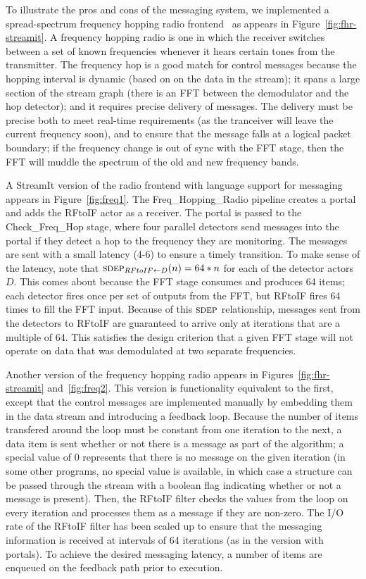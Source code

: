 To illustrate the pros and cons of the messaging system, we
implemented a spread-spectrum frequency hopping radio
frontend~\cite{harada02} as appears in Figure~\ref{fig:fhr-streamit}.
A frequency hopping radio is one in which the receiver switches
between a set of known frequencies whenever it hears certain tones
from the transmitter.  The frequency hop is a good match for control
messages because the hopping interval is dynamic (based on on the data
in the stream); it spans a large section of the stream graph (there is
an FFT between the demodulator and the hop detector); and it requires
precise delivery of messages.  The delivery must be precise both to
meet real-time requirements (as the tranceiver will leave the current
frequency soon), and to ensure that the message falls at a logical
packet boundary; if the frequency change is out of sync with the FFT
stage, then the FFT will muddle the spectrum of the old and new
frequency bands.

A StreamIt version of the radio frontend with language support for
messaging appears in Figure~\ref{fig:freq1}.  The Freq\_Hopping\_Radio
pipeline creates a portal and adds the RFtoIF actor as a receiver.
The portal is passed to the Check\_Freq\_Hop stage, where four
parallel detectors send messages into the portal if they detect a hop
to the frequency they are monitoring.  The messages are sent with a
small latency (4-6) to ensure a timely transition.  To make sense of
the latency, note that $\sdepf{RFtoIF}{D}(n) = 64*n$ for each of the
detector actors $D$.  This comes about because the FFT stage consumes
and produces 64 items; each detector fires once per set of outputs
from the FFT, but RFtoIF fires 64 times to fill the FFT input.
Because of this $\textsc{sdep}$ relationship, messages sent from the detectors
to RFtoIF are guaranteed to arrive only at iterations that are a
multiple of 64.  This satisfies the design criterion that a given FFT
stage will not operate on data that was demodulated at two separate
frequencies.

Another version of the frequency hopping radio appears in
Figures~\ref{fig:fhr-streamit} and~\ref{fig:freq2}.  This version is
functionality equivalent to the first, except that the control
messages are implemented manually by embedding them in the data stream
and introducing a feedback loop.  Because the number of items
transfered around the loop must be constant from one iteration to the
next, a data item is sent whether or not there is a message as part of
the algorithm; a special value of 0 represents that there is no
message on the given iteration (in some other programs, no special
value is available, in which case a structure can be passed through
the stream with a boolean flag indicating whether or not a message is
present).  Then, the RFtoIF filter checks the values from the loop on
every iteration and processes them as a message if they are non-zero.
The I/O rate of the RFtoIF filter has been scaled up to ensure that
the messaging information is received at intervals of 64 iterations
(as in the version with portals).  To achieve the desired messaging
latency, a number of items are enqueued on the feedback path prior to
execution.

